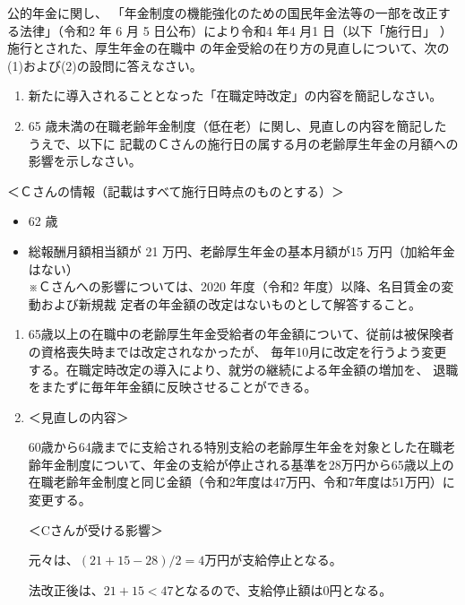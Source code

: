 \begin{shortanswer}[年金1 2020 問題2(3)]
  公的年金に関し、 「年金制度の機能強化のための国民年金法等の一部を改正する法律」（令和2
年 6 月 5 日公布）により令和4 年4 月1 日（以下「施行日」 ）施行とされた、厚生年金の在職中
の年金受給の在り方の見直しについて、次の(1)および(2)の設問に答えなさい。

\begin{enumerate}[(1)]
  \item 新たに導入されることとなった「在職定時改定」の内容を簡記しなさい。
  \item 65 歳未満の在職老齢年金制度（低在老）に関し、見直しの内容を簡記したうえで、以下に
記載のＣさんの施行日の属する月の老齢厚生年金の月額への影響を示しなさい。
\end{enumerate}


＜Ｃさんの情報（記載はすべて施行日時点のものとする）＞
\begin{itemize}
  \item 62 歳
  \item 総報酬月額相当額が 21 万円、老齢厚生年金の基本月額が15 万円（加給年金はない）
\\
※Ｃさんへの影響については、2020 年度（令和2 年度）以降、名目賃金の変動および新規裁
定者の年金額の改定はないものとして解答すること。
\end{itemize}

\end{shortanswer}


\begin{answerbox}
  \begin{enumerate}[(1)]
  \item 65歳以上の在職中の老齢厚生年金受給者の年金額について、従前は被保険者の資格喪失時までは改定されなかったが、
  毎年10月に改定を行うよう変更する。在職定時改定の導入により、就労の継続による年金額の増加を、
  退職をまたずに毎年年金額に反映させることができる。
  \item ＜見直しの内容＞
  
60歳から64歳までに支給される特別支給の老齢厚生年金を対象とした在職老齢年金制度について、年金の支給が停止される基準を28万円から65歳以上の在職老齢年金制度と同じ金額（令和2年度は47万円、令和7年度は51万円）に変更する。

＜Cさんが受ける影響＞

元々は、$(21+15-28)/2=4万円$が支給停止となる。

法改正後は、$21+15<47$となるので、支給停止額は0円となる。

\end{enumerate}
\end{answerbox}


